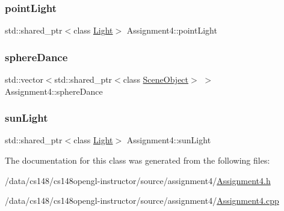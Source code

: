 \subsubsection{\texorpdfstring{point\+Light}{pointLight}}
{\footnotesize\ttfamily std\+::shared\+\_\+ptr$<$class \hyperlink{class_light}{Light}$>$ Assignment4\+::point\+Light\hspace{0.3cm}{\ttfamily [private]}}

\hypertarget{class_assignment4_aa16802895aa2aef461d130479c81a015}{}\label{class_assignment4_aa16802895aa2aef461d130479c81a015} 
\subsubsection{\texorpdfstring{sphere\+Dance}{sphereDance}}
{\footnotesize\ttfamily std\+::vector$<$std\+::shared\+\_\+ptr$<$class \hyperlink{class_scene_object}{Scene\+Object}$>$ $>$ Assignment4\+::sphere\+Dance\hspace{0.3cm}{\ttfamily [private]}}

\hypertarget{class_assignment4_ab2981232ba58193de1682308a1dbafdc}{}\label{class_assignment4_ab2981232ba58193de1682308a1dbafdc} 
\subsubsection{\texorpdfstring{sun\+Light}{sunLight}}
{\footnotesize\ttfamily std\+::shared\+\_\+ptr$<$class \hyperlink{class_light}{Light}$>$ Assignment4\+::sun\+Light\hspace{0.3cm}{\ttfamily [private]}}



The documentation for this class was generated from the following files\+:\begin{DoxyCompactItemize}
\item 
/data/cs148/cs148opengl-\/instructor/source/assignment4/\hyperlink{_assignment4_8h}{Assignment4.\+h}\item 
/data/cs148/cs148opengl-\/instructor/source/assignment4/\hyperlink{_assignment4_8cpp}{Assignment4.\+cpp}\end{DoxyCompactItemize}
